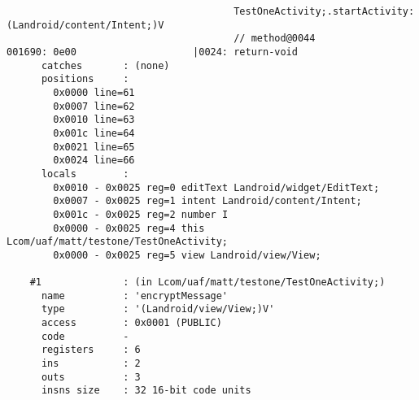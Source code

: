 \begin{lstlisting}
                                       TestOneActivity;.startActivity:(Landroid/content/Intent;)V
                                       // method@0044
001690: 0e00                    |0024: return-void
      catches       : (none)
      positions     :
        0x0000 line=61
        0x0007 line=62
        0x0010 line=63
        0x001c line=64
        0x0021 line=65
        0x0024 line=66
      locals        :
        0x0010 - 0x0025 reg=0 editText Landroid/widget/EditText;
        0x0007 - 0x0025 reg=1 intent Landroid/content/Intent;
        0x001c - 0x0025 reg=2 number I
        0x0000 - 0x0025 reg=4 this Lcom/uaf/matt/testone/TestOneActivity;
        0x0000 - 0x0025 reg=5 view Landroid/view/View;

    #1              : (in Lcom/uaf/matt/testone/TestOneActivity;)
      name          : 'encryptMessage'
      type          : '(Landroid/view/View;)V'
      access        : 0x0001 (PUBLIC)
      code          -
      registers     : 6
      ins           : 2
      outs          : 3
      insns size    : 32 16-bit code units




\end{lstlisting}
